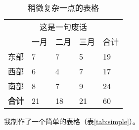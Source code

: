         \begin{table}[h!]
          \centering
          \caption{稍微复杂一点的表格}
          \label{tab:complex}
          \wuhao
          \begin{tabularx}{\linewidth}{XXXXX} \toprule 
                & \multicolumn{3}{c}{这是一句废话} &  \\ \cmidrule{2-4}
                & 一月 & 二月 & 三月 & 合计 \\ \midrule
           东部 &    7 &    7 &    5 &   19 \\ 
           西部 &    6 &    4 &    7 &   17 \\ 
           南部 &    8 &    7 &    9 &   24 \\ 
       \bf 合计 &   21 &   18 &   21 &   60 \\ \bottomrule
          \end{tabularx}
        \end{table}

        我制作了一个简单的表格（表\ref{tab:simple}）。

